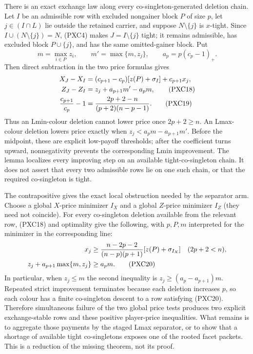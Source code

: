 \documentclass[11pt]{article}
\begin{document}
There is an exact exchange law along every co-singleton-generated deletion
chain.  Let $I$ be an admissible row with excluded nongainer block $P$ of
size $p$, let $j\in (I\cap L)$ lie outside the retained carrier, and suppose
$N\setminus\{j\}$ is $x$-tight.  Since
$I\cup(N\setminus\{j\})=N$, (PXC4) makes
$J=I\setminus\{j\}$ tight; it remains admissible, has excluded block
$P\cup\{j\}$, and has the same omitted-gainer block.  Put
\[
 m=\max_{i\in P}z_i,\qquad m'=\max\{m,z_j\},\qquad
 a_p=p(c_p-1)_+.
\]
Then direct subtraction in the two price formulas gives
\begin{align}
 X_J-X_I
  &=(c_{p+1}-c_p)[z(P)+\sigma_I]+c_{p+1}x_j,\notag\\
 Z_J-Z_I
  &=z_j+a_{p+1}m'-a_pm,                             \tag{PXC18}\\
 \frac{c_{p+1}}{c_p}-1
  &=\frac{2p+2-n}{(p+2)(n-p-1)}.                   \tag{PXC19}
\end{align}
Thus an Lmin-colour deletion cannot lower price once $2p+2\ge n$.
An Lmax-colour deletion lowers price exactly when
$z_j<a_pm-a_{p+1}m'$.  Before the midpoint, these are explicit low-payoff
thresholds; after the coefficient turns upward, nonnegativity prevents the
corresponding Lmin improvement.  The lemma localizes every improving step on
an available tight-co-singleton chain.  It does not assert that every two
admissible rows lie on one such chain, or that the required co-singleton is
tight.

The contrapositive gives the exact local obstruction needed by the separator
arm.  Choose a global $X$-price minimizer $I_X$ and a global $Z$-price
minimizer $I_Z$ (they need not coincide).  For every co-singleton deletion
available from the relevant row, (PXC18) and optimality give the following,
with $p,P,m$ interpreted for the minimizer in the corresponding line:
\begin{align}
 x_j&\ge
 \frac{n-2p-2}{(n-p)(p+1)}[z(P)+\sigma_{I_X}]
 &&(2p+2<n),\notag\\
 z_j+a_{p+1}\max\{m,z_j\}&\ge a_pm.                \tag{PXC20}
\end{align}
In particular, when $z_j\le m$ the second inequality is
$z_j\ge(a_p-a_{p+1})m$.  Repeated strict improvement terminates because each
deletion increases $p$, so each colour has a finite co-singleton descent to a
row satisfying (PXC20).  Therefore simultaneous failure of the two global
price tests produces two explicit exchange-stable rows and these positive
player-price inequalities.  What remains is to aggregate those payments by
the staged Lmax separator, or to show that a shortage of available tight
co-singletons exposes one of the rooted facet packets.  This is a reduction
of the missing theorem, not its proof.
\end{document}
